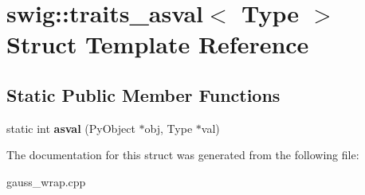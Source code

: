 \hypertarget{structswig_1_1traits__asval}{\section{swig\-:\-:traits\-\_\-asval$<$ Type $>$ Struct Template Reference}
\label{structswig_1_1traits__asval}
}
\subsection*{Static Public Member Functions}
\begin{DoxyCompactItemize}
\item 
\hypertarget{structswig_1_1traits__asval_a5d0ee3dd0c23458db2aeae93d8c02bc0}{static int {\bfseries asval} (Py\-Object $\ast$obj, Type $\ast$val)}\label{structswig_1_1traits__asval_a5d0ee3dd0c23458db2aeae93d8c02bc0}

\end{DoxyCompactItemize}


The documentation for this struct was generated from the following file\-:\begin{DoxyCompactItemize}
\item 
gauss\-\_\-wrap.\-cpp\end{DoxyCompactItemize}
